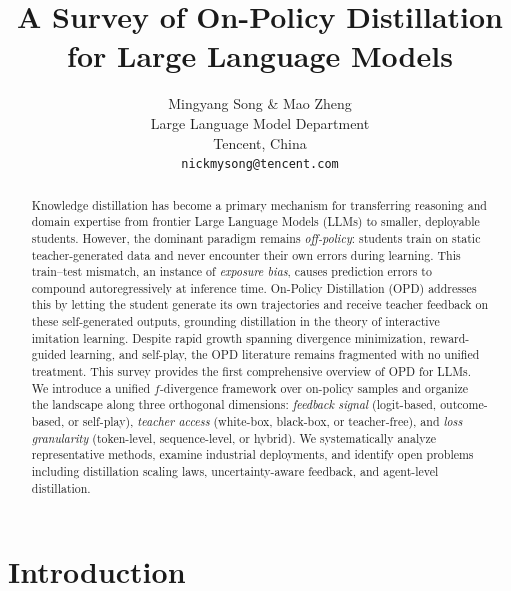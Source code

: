 \documentclass{article} %
\title{A Survey of On-Policy Distillation for Large Language Models}
\author{Mingyang Song \& Mao Zheng \\
Large Language Model Department \\Tencent, China\\
\texttt{nickmysong@tencent.com}}
\begin{document}
\ifcolmsubmission
\linenumbers
\fi

\maketitle


\begin{abstract}
Knowledge distillation has become a primary mechanism for transferring reasoning and domain expertise from frontier Large Language Models (LLMs) to smaller, deployable students. However, the dominant paradigm remains \textit{off-policy}: students train on static teacher-generated data and never encounter their own errors during learning. This train--test mismatch, an instance of \textit{exposure bias}, causes prediction errors to compound autoregressively at inference time.
On-Policy Distillation (OPD) addresses this by letting the student generate its own trajectories and receive teacher feedback on these self-generated outputs, grounding distillation in the theory of interactive imitation learning. Despite rapid growth spanning divergence minimization, reward-guided learning, and self-play, the OPD literature remains fragmented with no unified treatment.
This survey provides the first comprehensive overview of OPD for LLMs. We introduce a unified $f$-divergence framework over on-policy samples and organize the landscape along three orthogonal dimensions: \emph{feedback signal} (logit-based, outcome-based, or self-play), \emph{teacher access} (white-box, black-box, or teacher-free), and \emph{loss granularity} (token-level, sequence-level, or hybrid). We systematically analyze representative methods, examine industrial deployments, and identify open problems including distillation scaling laws, uncertainty-aware feedback, and agent-level distillation.
\end{abstract}

\section{Introduction}
\label{sec:intro}
\end{document}
